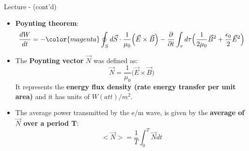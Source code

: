 %
%
%

\begin{frame}{Lecture \summarizedlecture - \lecturesummarytitle (cont'd)}

\begin{itemize}

\item
{\bf Poynting theorem}:
\begin{equation*}
  \frac{dW}{dt} =
     - {\color{magenta} \oint_{S} d\vec{S} \cdot \frac{1}{\mu_0} \Big(\vec{E} \times \vec{B} \Big) }
     - \frac{\partial}{\partial t} \int_{\tau} d\tau  \Big( \frac{1}{2\mu_0} \vec{B}^2 + \frac{\epsilon_0}{2} \vec{E}^2 \Big)
\end{equation*}

\item
The {\bf Poynting vector} $\vec{N}$ was defined as:
\begin{equation*}
  \vec{N} = \frac{1}{\mu_0} \Big( \vec{E} \times \vec{B} \Big)
\end{equation*}
It represents the {\bf energy flux density (rate energy transfer per unit area)} and it has units of $W(att)/m^2$.\\

\item
The average power transmitted by the e/m wave, is given by
the {\bf average of $\vec{N}$ over a period T}:
\begin{equation*}
  <\vec{N}> = \frac{1}{T} \int_{0}^{T} \vec{N} dt
\end{equation*}

\end{itemize}

\end{frame}


%
%
%

